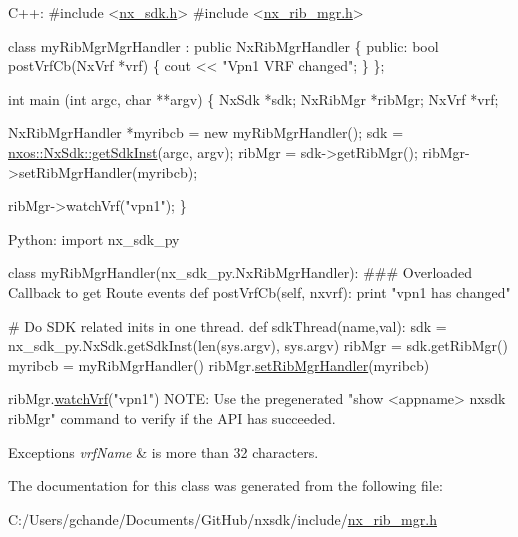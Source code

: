 \begin{DoxyCode}
 C++:
\textcolor{preprocessor}{      #include <\mbox{\hyperlink{nx__sdk_8h}{nx\_sdk.h}}>}
\textcolor{preprocessor}{      #include <\mbox{\hyperlink{nx__rib__mgr_8h}{nx\_rib\_mgr.h}}>}

      \textcolor{keyword}{class }myRibMgrMgrHandler : \textcolor{keyword}{public} NxRibMgrHandler \{
         \textcolor{keyword}{public}:
            \textcolor{keywordtype}{bool} postVrfCb(NxVrf *vrf) \{
                 cout << \textcolor{stringliteral}{"Vpn1 VRF changed"};
            \}
      \};

      \textcolor{keywordtype}{int}  main (\textcolor{keywordtype}{int} argc, \textcolor{keywordtype}{char} **argv)
      \{
           NxSdk    *sdk;
           NxRibMgr *ribMgr;
           NxVrf    *vrf;

           NxRibMgrHandler *myribcb = \textcolor{keyword}{new} myRibMgrHandler();
           sdk = \mbox{\hyperlink{classnxos_1_1_nx_sdk_a5050e2d26c40744b4fc7862068a83f39}{nxos::NxSdk::getSdkInst}}(argc, argv);
           ribMgr = sdk->getRibMgr();
           ribMgr->setRibMgrHandler(myribcb);

           ribMgr->watchVrf(\textcolor{stringliteral}{"vpn1"});
      \}

 Python:
    \textcolor{keyword}{import} nx\_sdk\_py

    \textcolor{keyword}{class }myRibMgrHandler(nx\_sdk\_py.NxRibMgrHandler):
\textcolor{preprocessor}{    ### Overloaded Callback to get Route events}
          def postVrfCb(self, nxvrf):
              print "vpn1 has changed"

\textcolor{preprocessor}{    # Do SDK related inits in one thread.}
    def sdkThread(name,val):
        sdk = nx\_sdk\_py.NxSdk.getSdkInst(len(sys.argv), sys.argv)
        ribMgr = sdk.getRibMgr()
        myribcb = myRibMgrHandler()
        ribMgr.\mbox{\hyperlink{classnxos_1_1_nx_rib_mgr_ac42dd29e34f9c508614733dbec518b99}{setRibMgrHandler}}(myribcb)

        ribMgr.\mbox{\hyperlink{classnxos_1_1_nx_rib_mgr_a35e2a52be337d47cd111803f64aca904}{watchVrf}}("vpn1")
NOTE: Use the pregenerated "show <appname> nxsdk ribMgr" command
      to verify if the API has succeeded.
\end{DoxyCode}



\begin{DoxyExceptions}{Exceptions}
{\em vrf\+Name} & is more than 32 characters. \\
\hline
\end{DoxyExceptions}


The documentation for this class was generated from the following file\+:\begin{DoxyCompactItemize}
\item 
C\+:/\+Users/gchande/\+Documents/\+Git\+Hub/nxsdk/include/\mbox{\hyperlink{nx__rib__mgr_8h}{nx\+\_\+rib\+\_\+mgr.\+h}}\end{DoxyCompactItemize}
